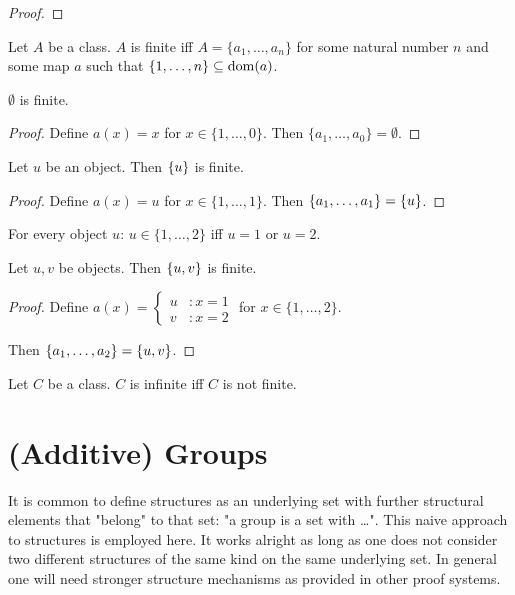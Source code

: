 \documentclass[11pt]{article}
\newcommand{\Seq}[2]{\{#1,\dots,#2\}}
\newcommand{\FinSet}[3]{\{#1_{#2},\dots,#1_{#3}\}}
\begin{document}
\begin{forthel}
\begin{proof}
\end{proof}

\begin{definition} Let $A$ be a class.
$A$ is finite iff
$A = \FinSet{a}{1}{n}$ for some natural number $n$ and some map $a$ such 
that $\Seq{1}{n} \subseteq \dom(a)$.
\end{definition}

\begin{lemma}
$\emptyset$ is finite.
\end{lemma}
\begin{proof}
Define $a(x) = x$ for $x \in \Seq{1}{0}$.
Then $\FinSet{a}{1}{0} = \emptyset$.
\end{proof}

\begin{lemma}
Let $u$ be an object. Then
$\{u\}$ is finite.
\end{lemma}
\begin{proof}
Define $a(x) = u$ for $x \in \Seq{1}{1}$.
Then $\FinSet{a}{1}{1} = \sing{u}$. 
\end{proof}

\begin{lemma}
For every object $u$:
$u \in \Seq{1}{2}$ iff $u = 1$ or $u = 2$.
\end{lemma}

\begin{lemma}
Let $u,v$ be objects. Then
$\{u,v\}$ is finite.
\end{lemma}

\begin{proof}
Define
$  a(x) =
    \begin{cases}
    u  & : x = 1 \\
    v  & : x = 2
    \end{cases} $
  for $x \in \Seq{1}{2}$.

Then $\FinSet{a}{1}{2} = \unp{u}{v}$. 
\end{proof}

\begin{definition} Let $C$ be a class.
$C$ is infinite iff $C$ is not finite.
\end{definition}

\end{forthel}

\section{(Additive) Groups}

It is common to define structures as an underlying set with further
structural elements that "belong" to that set: "a group is a set with
\dots". This naive approach to structures is employed here.
It works alright as long as one
does not consider two different structures of the same kind on the
same underlying set. In general one will need stronger structure mechanisms as 
provided in other proof systems.
  
\end{document}
